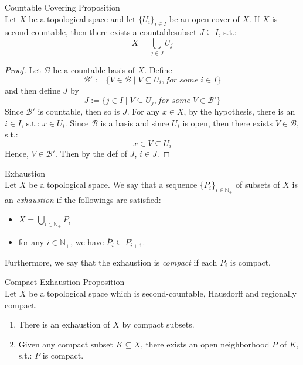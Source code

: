 \begin{proposition}{Countable Covering Proposition}\\
Let $X$ be a topological space and let $\{U_i\}_{i \in I}$ be an open cover of $X$. If $X$ is second-countable, then there exists a countablesubset $J \subseteq I$, s.t.:
$$X = \bigcup_{j \in J} U_j$$
\end{proposition}

\begin{proof}
    Let $\mathcal{B}$ be a countable basis of $X$. Define
    $$\mathcal{B}':= \{V \in \mathcal{B} \mid V \subseteq U_i, for\;some\; i\in I\}$$
    and then define $J$ by
    $$J := \{j \in I \mid V \subseteq U_j,for\;some\; V \in \mathcal{B}' \}$$
    Since $\mathcal{B}'$ is countable, then so is $J$. For any $x \in X$, by the hypothesis, there is an $i \in I$, s.t.: $x \in U_i$. Since $\mathcal{B}$ is a basis and since $U_i$ is open, then there exists $V \in \mathcal{B}$, s.t.:
    $$x \in V \subseteq U_i$$
    Hence, $V \in \mathcal{B}'$. Then by the def of $J$, $i\in J$.
\end{proof}

\begin{definition}{Exhaustion}\\
 Let $X$ be a topological space. We say that a sequence $\{P_i\}_{i \in \mathbb{N}_+}$ of subsets of $X$ is an \textit{exhaustion} if the followings are satisfied:
 \begin{itemize}
     \item $X= \bigcup_{i \in \mathbb{N}_+} P_i$
     \item for any $i \in \mathbb{N}_+$, we have $\overline{P}_i \subseteq P_{i+1} ^\circ$.
 \end{itemize}
 Furthermore, we say that the exhaustion is \textit{compact} if each $P_i$ is compact.
\end{definition}

\begin{proposition}{Compact Exhaustion Proposition}\\
Let $X$ be a topological space which is second-countable, Hausdorff and regionally compact.
\begin{enumerate}
    \item There is an exhaustion of $X$ by compact subsets.
    \item Given any compact subset $K \subseteq X$, there exists an open neighborhood $P$ of $K$, s.t.: $\overline{P}$ is compact.
\end{enumerate}
\end{proposition}

